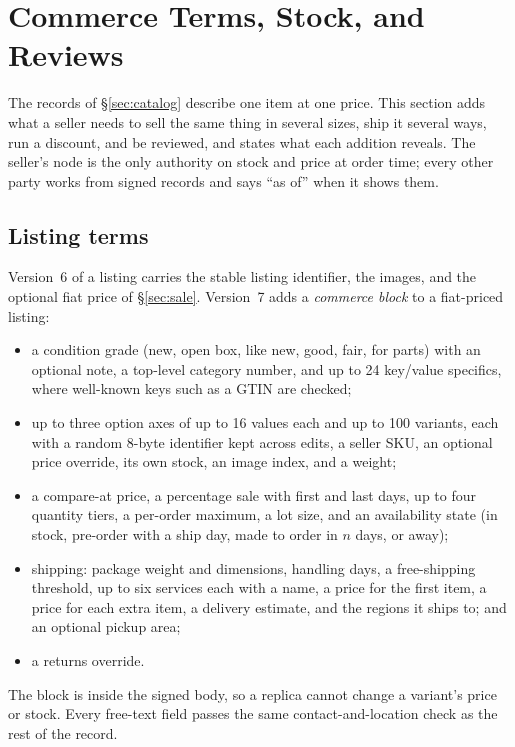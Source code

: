 \section{Commerce Terms, Stock, and Reviews}
\label{sec:commerce}

The records of \S\ref{sec:catalog} describe one item at one price. This section adds what a seller needs to sell the same thing in several sizes, ship it several ways, run a discount, and be reviewed, and states what each addition reveals. The seller's node is the only authority on stock and price at order time; every other party works from signed records and says ``as of'' when it shows them.

\subsection{Listing terms}

Version~6 of a listing carries the stable listing identifier, the images, and the optional fiat price of \S\ref{sec:sale}. Version~7 adds a \emph{commerce block} to a fiat-priced listing:
\begin{itemize}
  \item a condition grade (new, open box, like new, good, fair, for parts) with an optional note, a top-level category number, and up to 24 key/value specifics, where well-known keys such as a GTIN are checked;
  \item up to three option axes of up to 16 values each and up to 100 variants, each with a random 8-byte identifier kept across edits, a seller SKU, an optional price override, its own stock, an image index, and a weight;
  \item a compare-at price, a percentage sale with first and last days, up to four quantity tiers, a per-order maximum, a lot size, and an availability state (in stock, pre-order with a ship day, made to order in $n$ days, or away);
  \item shipping: package weight and dimensions, handling days, a free-shipping threshold, up to six services each with a name, a price for the first item, a price for each extra item, a delivery estimate, and the regions it ships to; and an optional pickup area;
  \item a returns override.
\end{itemize}
The block is inside the signed body, so a replica cannot change a variant's price or stock. Every free-text field passes the same contact-and-location check as the rest of the record.

